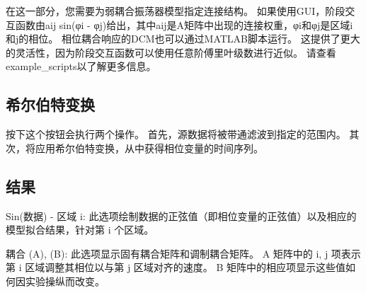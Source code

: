 在这一部分，您需要为弱耦合振荡器模型指定连接结构。
如果使用GUI，阶段交互函数由aij sin(φi - φj)给出，其中aij是A矩阵中出现的连接权重，φi和φj是区域i和j的相位。
相位耦合响应的DCM也可以通过MATLAB脚本运行。
这提供了更大的灵活性，因为阶段交互函数可以使用任意阶傅里叶级数进行近似。
请查看example\_scripts以了解更多信息。


\subsection{希尔伯特变换}

按下这个按钮会执行两个操作。
首先，源数据将被带通滤波到指定的范围内。
其次，将应用希尔伯特变换，从中获得相位变量的时间序列。


\subsection{结果}

Sin(数据) - 区域 i:
此选项绘制数据的正弦值（即相位变量的正弦值）以及相应的模型拟合结果，针对第 i 个区域。

耦合 (A), (B):
此选项显示固有耦合矩阵和调制耦合矩阵。
A 矩阵中的 i, j 项表示第 i 区域调整其相位以与第 j 区域对齐的速度。
B 矩阵中的相应项显示这些值如何因实验操纵而改变。